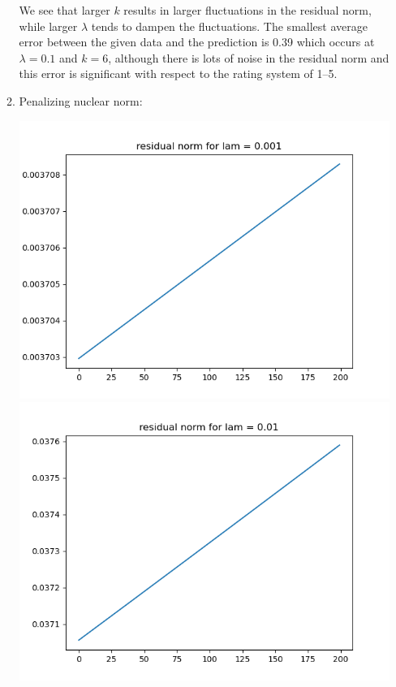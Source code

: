 \documentclass{article}
\begin{document}
\begin{enumerate}
\begin{enumerate}
		We see that larger $k$ results in larger fluctuations in the residual norm, while larger $\lambda$ tends to dampen the fluctuations. The smallest average error between the given data and the prediction is 0.39 which occurs at $\lambda=0.1$ and $k=6$, although there is lots of noise in the residual norm and this error is significant with respect to the rating system of 1--5.
		
		
		
		\pagebreak
		
		
		
		\item Penalizing nuclear norm:
		
		\begin{center}
			\includegraphics[scale=.3]{hw7p1b residual norm for lamcount = 1}
			\includegraphics[scale=.3]{hw7p1b residual norm for lamcount = 2}

\end{center}
\end{enumerate}
\end{enumerate}
\end{document}
